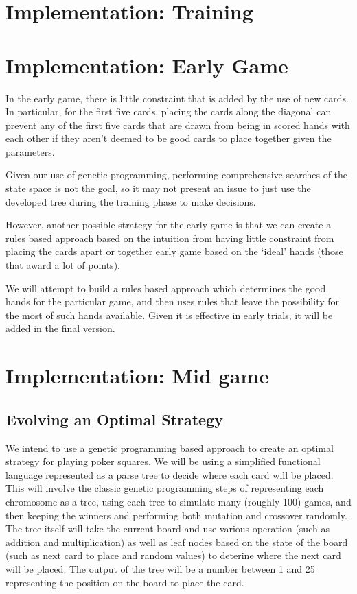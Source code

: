 \documentclass[twoside]{article}
\begin{document}
\begin{multicols}{2}

\section{Implementation: Training}



\section{Implementation: Early Game}
In the early game, there is little constraint that is added by the use of new cards. In particular, for the first five cards, placing the cards along the diagonal can prevent any of the first five cards that are drawn from being in scored hands with each other if they aren't deemed to be good cards to place together given the parameters.

Given our use of genetic programming, performing comprehensive searches of the state space is not the goal, so it may not present an issue to just use the developed tree during the training phase to make decisions.

However, another possible strategy for the early game is that we can create a rules based approach based on the intuition from having little constraint from placing the cards apart or together early game based on the `ideal' hands (those that award a lot of points).

We will attempt to build a rules based approach which determines the good hands for the particular game, and then uses rules that leave the possibility for the most of such hands available. Given it is effective in early trials, it will be added in the final version.

\section{Implementation: Mid game}

\subsection{Evolving an Optimal Strategy}
We intend to use a genetic programming based approach to create an optimal strategy for playing poker squares. We will be using a simplified functional language represented as a parse tree to decide where each card will be placed. This will involve the classic genetic programming steps of representing each chromosome as a tree, using each tree to simulate many (roughly 100) games, and then keeping the winners and performing both mutation and crossover randomly. The tree itself will take the current board and use various operation (such as addition and multiplication) as well as leaf nodes based on the state of the board (such as next card to place and random values) to deterine where the next card will be placed. The output of the tree will be a number between 1 and 25 representing the position on the board to place the card.


\end{multicols}
\end{document}
